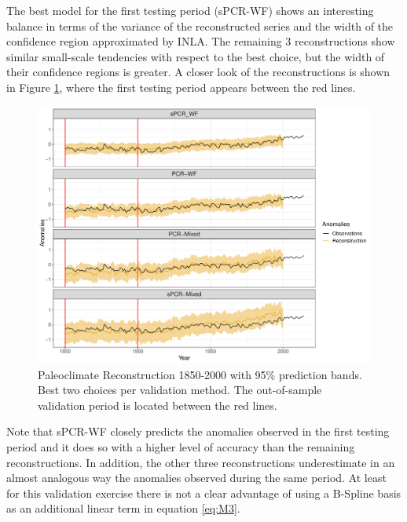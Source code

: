 \documentclass[12pt]{amsart}
\theoremstyle{plain}
\theoremstyle{definition}
\theoremstyle{remark}
\begin{document}
The best model for the first testing period (sPCR-WF) shows an interesting
balance in terms of the variance of the reconstructed series and the width of
the confidence region approximated by INLA. The remaining 3 reconstructions show
similar small-scale tendencies with respect to the best choice, but the width of
their confidence regions is greater. A closer look of the reconstructions is shown in Figure
\ref{fig:paleo19001}, where the first testing period appears between the red lines.
\begin{figure}
  \centering
  \includegraphics[scale=0.40]{Rec1900_Final}
  \caption{Paleoclimate Reconstruction 1850-2000 with 95\%
    prediction bands. Best two choices per validation method. The out-of-sample validation period is
    located between the red lines.}
  \label{fig:paleo19001}
\end{figure}
Note that sPCR-WF closely predicts the anomalies observed in the first testing
period and it does so with a higher level of accuracy than the remaining
reconstructions. In addition, the other three reconstructions underestimate in
an almost analogous way the anomalies observed during the same period. At least
for this validation exercise there is not a clear advantage of using a B-Spline
basis as an additional linear term in equation \eqref{eq:M3}.
\end{document}
